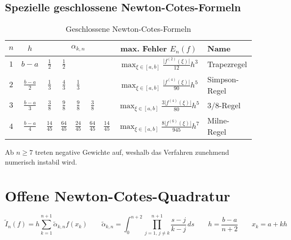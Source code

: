 \documentclass[a4paper, 11pt, accentcolor = tud3b]{tudreport}
\newcommand{\abs}[1]{\ensuremath{{\lvert #1 \rvert}}}
\begin{document}
	        \subsection{Spezielle geschlossene Newton-Cotes-Formeln}
		        \begin{table}[H]
		        	\centering
		        	\begin{tabular}{c | c ccccc c l}
		        		\textbf{\(n\)} & \textbf{\(h\)}    &                           \multicolumn{5}{c}{\textbf{\(\alpha_{k,n}\)}}                           & \textbf{max. Fehler \( E_n(f) \)}                                & \textbf{Name} \\ \hline
		        		    \(1\)      & \(b-a\)           & \(\frac{1}{2}\)   &  \(\frac{1}{2}\)  &                   &                   &                   & \( \max_{\xi \in [a, b]} \frac{\abs{f^{(2)}(\xi)}}{12} h^3 \)    & Trapezregel   \\
		        		    \(2\)      & \(\frac{b-a}{2}\) & \(\frac{1}{3}\)   &  \(\frac{4}{3}\)  &  \(\frac{1}{3}\)  &                   &                   & \( \max_{\xi \in [a, b]} \frac{\abs{f^{(4)}(\xi)}}{90} h^5 \)    & Simpson-Regel \\
		        		    \(3\)      & \(\frac{b-a}{3}\) & \(\frac{3}{8}\)   &  \(\frac{9}{8}\)  &  \(\frac{9}{8}\)  &  \(\frac{3}{8}\)  &                   & \( \max_{\xi \in [a, b]} \frac{3 \abs{f^{(4)}(\xi)}}{80} h^5 \)  & 3/8-Regel     \\
		        		    \(4\)      & \(\frac{b-a}{4}\) & \(\frac{14}{45}\) & \(\frac{64}{45}\) & \(\frac{24}{45}\) & \(\frac{64}{45}\) & \(\frac{14}{45}\) & \( \max_{\xi \in [a, b]} \frac{8 \abs{f^{(6)}(\xi)}}{945} h^7 \) & Milne-Regel
		        	\end{tabular}
		        	\caption{Geschlossene Newton-Cotes-Formeln}
		        \end{table}
		        Ab \( n \geq 7 \) treten negative Gewichte auf, weshalb das Verfahren zunehmend numerisch instabil wird.
	
	    \section{Offene Newton-Cotes-Quadratur}
	        \begin{equation*}
		        \tilde{I}_n(f) = h \sum_{k=1}^{n+1} \tilde{\alpha}_{k,n} f(x_k) \qquad \tilde{\alpha}_{k,n} = \int_{0}^{n+2} \! \prod_{j = 1,\, j \neq k}^{n + 1} \frac{s-j}{k-j} \, ds \qquad h = \frac{b-a}{n+2} \qquad x_k = a + kh
	        \end{equation*}
	        
\end{document}
